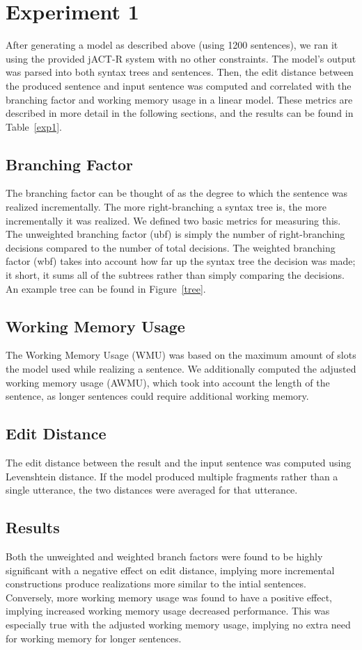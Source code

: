 \section{Experiment 1}
After generating a model as described above (using 1200 sentences), we ran it using the provided jACT-R system with no other constraints. The model's output was parsed into both syntax trees and sentences. Then, the edit distance between the produced sentence and input sentence was computed and correlated with the branching factor and working memory usage in a linear model. These metrics are described in more detail in the following sections, and the results can be found in Table~\ref{exp1}.  

\subsection{Branching Factor}
The branching factor can be thought of as the degree to which the sentence was realized incrementally. The more right-branching a syntax tree is, the more incrementally it was realized. We defined two basic metrics for measuring this. The unweighted branching factor (ubf) is simply the number of right-branching decisions compared to the number of total decisions. The weighted branching factor (wbf) takes into account how far up the syntax tree the decision was made; it short, it sums all of the subtrees rather than simply comparing the decisions. An example tree can be found in Figure~\ref{tree}. 

\subsection{Working Memory Usage}
The Working Memory Usage (WMU) was based on the maximum amount of slots the model used while realizing a sentence. We additionally computed the adjusted working memory usage (AWMU), which took into account the length of the sentence, as longer sentences could require additional working memory.

\subsection{Edit Distance}
The edit distance between the result and the input sentence was computed using Levenshtein distance. If the model produced multiple fragments rather than a single utterance, the two distances were averaged for that utterance.

\subsection{Results}
Both the unweighted and weighted branch factors were found to be highly significant with a negative effect on edit distance, implying more incremental constructions produce realizations more similar to the intial sentences. Conversely, more working memory usage was found to have a positive effect, implying increased working memory usage decreased performance. This was especially true with the adjusted working memory usage, implying no extra need for working memory for longer sentences. 

